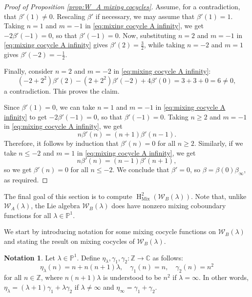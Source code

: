 \documentclass[11pt, svgnames]{amsart}
\newcommand{\ZZ}{\mathbb{Z}}
\newcommand{\CC}{\mathbb{C}}
\newcommand{\PP}{\mathbb{P}}
\newcommand{\W}{\mathcal{W}}
\DeclareMathOperator{\HH}{H}
\DeclareMathOperator{\Mix}{Mix}
\theoremstyle{definition}
\newtheorem{Notation}[proposition]{Notation}
\begin{document}
\begin{proof}[Proof of Proposition \ref{prop:W_A mixing cocycles}]
    Assume, for a contradiction, that $\beta'(1) \neq 0$. Rescaling $\beta'$ if necessary, we may assume that $\beta'(1) = 1$. Taking $n = 1$ and $m = -1$ in \eqref{eq:mixing cocycle A infinity}, we get $-2\beta'(-1) = 0$, so that $\beta'(-1) = 0$. Now, substituting $n = 2$ and $m = -1$ in \eqref{eq:mixing cocycle A infinity} gives $\beta'(2) = \frac{3}{2}$, while taking $n = -2$ and $m = 1$ gives $\beta'(-2) = -\frac{1}{2}$.

    Finally, consider $n = 2$ and $m = -2$ in \eqref{eq:mixing cocycle A infinity}:
    $$(-2 + 2^2)\beta'(2) - (2 + 2^2)\beta'(-2) + 4\beta'(0) = 3 + 3 + 0 = 6 \neq 0,$$
    a contradiction. This proves the claim.

    Since $\beta'(1) = 0$, we can take $n = 1$ and $m = -1$ in \eqref{eq:mixing cocycle A infinity} to get $-2\beta'(-1) = 0$, so that $\beta'(-1) = 0$. Taking $n \geq 2$ and $m = -1$ in \eqref{eq:mixing cocycle A infinity}, we get
    $$n \beta'(n) = (n + 1)\beta'(n - 1).$$
    Therefore, it follows by induction that $\beta'(n) = 0$ for all $n \geq 2$. Similarly, if we take $n \leq -2$ and $m = 1$ in \eqref{eq:mixing cocycle A infinity}, we get
    $$n\beta'(n) = (n - 1)\beta'(n + 1),$$
    so we get $\beta'(n) = 0$ for all $n \leq -2$. We conclude that $\beta' = 0$, so $\beta = \beta(0) \beta_\infty$, as required.
\end{proof}

The final goal of this section is to compute $\HH_{\Mix}^2(\W_B(\lambda))$. Note that, unlike $\W_A(\lambda)$, the Lie algebra $\W_B(\lambda)$ does have nonzero mixing coboundary functions for all $\lambda \in \PP^1$.

We start by introducing notation for some mixing cocycle functions on $\W_B(\lambda)$ and stating the result on mixing cocycles of $\W_B(\lambda)$.

\begin{Notation}\label{ntt:mixing cocycles B}
    Let $\lambda \in \PP^1$. Define $\eta_\lambda, \gamma_1, \gamma_2 \colon \ZZ \to \CC$ as follows:
    $$\eta_\lambda(n) = n + n(n + 1)\lambda, \quad \gamma_1(n) = n, \quad \gamma_2(n) = n^2$$
    for all $n \in \ZZ$, where $n(n + 1)\lambda$ is understood to be $n^2$ if $\lambda = \infty$. In other words, $\eta_\lambda = (\lambda + 1) \gamma_1 + \lambda \gamma_2$ if $\lambda \neq \infty$ and $\eta_\infty = \gamma_1 + \gamma_2$.
\end{Notation}
\end{document}
